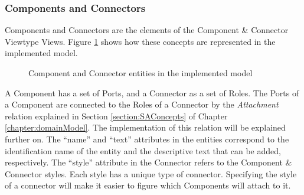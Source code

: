 \documentclass{llncs}
\begin{document}
\subsubsection{Components and Connectors}
\label{subsection:modelComponentsConnectors}
Components and Connectors are the elements of the Component \& Connector Viewtype Views. Figure \ref{figure:modelComponentConnector} shows how these concepts are represented in the implemented model.

\begin{figure}
\centering
\renewcommand {\umltextcolor}{black}
\renewcommand {\umlfillcolor}{none}
\renewcommand {\umldrawcolor}{black}
\caption{Component and Connector entities in the implemented model}
\label{figure:modelComponentConnector}
\end{figure}
 
A Component has a set of Ports, and a Connector as a set of Roles. The Ports of a Component are connected to the Roles of a Connector by the \textit{Attachment} relation explained in Section \ref{section:SAConcepts} of Chapter \ref{chapter:domainModel}. The implementation of this relation will be explained further on. The ``name'' and ``text'' attributes in the entities correspond to the identification name of the entity and the descriptive text that can be added, respectively. The ``style'' attribute in the Connector refers to the Component \& Connector styles. Each style has a unique type of connector. Specifying the style of a connector will make it easier to figure which Components will attach to it.
\end{document}
